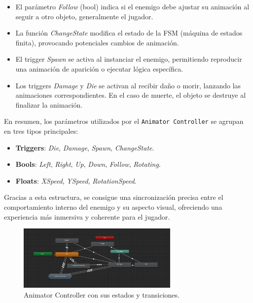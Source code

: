 \begin{itemize}
	\item El parámetro \textit{Follow} (bool) indica si el enemigo debe ajustar su animación al seguir a otro objeto, generalmente el jugador.
	\item La función \textit{ChangeState} modifica el estado de la FSM (máquina de estados finita), provocando potenciales cambios de animación.
	\item El trigger \textit{Spawn} se activa al instanciar el enemigo, permitiendo reproducir una animación de aparición o ejecutar lógica específica.
	\item Los triggers \textit{Damage} y \textit{Die} se activan al recibir daño o morir, lanzando las animaciones correspondientes. En el caso de muerte, el objeto se destruye al finalizar la animación.
\end{itemize}

En resumen, los parámetros utilizados por el \texttt{Animator Controller} se agrupan en tres tipos principales:

\begin{itemize}
	\item \textbf{Triggers}: \textit{Die}, \textit{Damage}, \textit{Spawn}, \textit{ChangeState}.
	\item \textbf{Bools}: \textit{Left}, \textit{Right}, \textit{Up}, \textit{Down}, \textit{Follow}, \textit{Rotating}.
	\item \textbf{Floats}: \textit{XSpeed}, \textit{YSpeed}, \textit{RotationSpeed}.
\end{itemize}

Gracias a esta estructura, se consigue una sincronización precisa entre el comportamiento interno del enemigo y su aspecto visual, ofreciendo una experiencia más inmersiva y coherente para el jugador.

\begin{figure}[t]
	\centering
	\includegraphics[width = 0.7\textwidth]{Imagenes/AnimatorController.png}
	\caption{Animator Controller con sus estados y transiciones.}
	\label{fig:AnimatorController_Image}
\end{figure}

